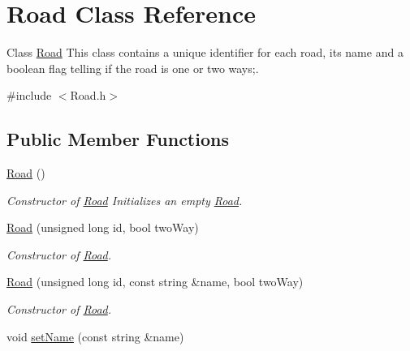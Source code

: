 \hypertarget{class_road}{}\section{Road Class Reference}
\label{class_road}


Class \hyperlink{class_road}{Road} This class contains a unique identifier for each road, its name and a boolean flag telling if the road is one or two ways;.  




{\ttfamily \#include $<$Road.\+h$>$}

\subsection*{Public Member Functions}
\begin{DoxyCompactItemize}
\item 
\hyperlink{class_road_a90bb6be2a5c3b6997849a915e2af0cf0}{Road} ()\hypertarget{class_road_a90bb6be2a5c3b6997849a915e2af0cf0}{}\label{class_road_a90bb6be2a5c3b6997849a915e2af0cf0}

\begin{DoxyCompactList}\small\item\em Constructor of \hyperlink{class_road}{Road} Initializes an empty \hyperlink{class_road}{Road}. \end{DoxyCompactList}\item 
\hyperlink{class_road_a37a287816f8e1bac4bb655bdc357f77f}{Road} (unsigned long id, bool two\+Way)
\begin{DoxyCompactList}\small\item\em Constructor of \hyperlink{class_road}{Road}. \end{DoxyCompactList}\item 
\hyperlink{class_road_a74b26f072c8a311b7ed06ad839dfb885}{Road} (unsigned long id, const string \&name, bool two\+Way)
\begin{DoxyCompactList}\small\item\em Constructor of \hyperlink{class_road}{Road}. \end{DoxyCompactList}\item 
void \hyperlink{class_road_afce03f37f554b9580b1cae21a486ba43}{set\+Name} (const string \&name)\hypertarget{class_road_afce03f37f554b9580b1cae21a486ba43}{}\label{class_road_afce03f37f554b9580b1cae21a486ba43}


\end{DoxyCompactItemize}
